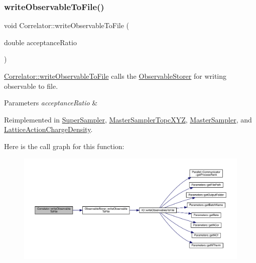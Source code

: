\subsubsection{\texorpdfstring{writeObservableToFile()}{writeObservableToFile()}}
{\footnotesize\ttfamily void Correlator\+::write\+Observable\+To\+File (\begin{DoxyParamCaption}\item[{double}]{acceptance\+Ratio }\end{DoxyParamCaption})\hspace{0.3cm}{\ttfamily [virtual]}}



\mbox{\hyperlink{class_correlator_a9e8d80e30e4fbe3b7fe57521538cb5ff}{Correlator\+::write\+Observable\+To\+File}} calls the \mbox{\hyperlink{class_observable_storer}{Observable\+Storer}} for writing observable to file. 


\begin{DoxyParams}{Parameters}
{\em acceptance\+Ratio} & \\
\hline
\end{DoxyParams}


Reimplemented in \mbox{\hyperlink{class_super_sampler_a05b42b82879233dc329d280a61bfd7f0}{Super\+Sampler}}, \mbox{\hyperlink{class_master_sampler_topc_x_y_z_a930f13a2a13f4b3820f40c8b52110cf2}{Master\+Sampler\+Topc\+X\+YZ}}, \mbox{\hyperlink{class_master_sampler_a638714c38e1a6252ab8b6be1fa224bd4}{Master\+Sampler}}, and \mbox{\hyperlink{class_lattice_action_charge_density_a719f71aaccbf1b4147ea944781d69908}{Lattice\+Action\+Charge\+Density}}.

Here is the call graph for this function\+:
\nopagebreak
\begin{figure}[H]
\begin{center}
\leavevmode
\includegraphics[width=350pt]{class_correlator_a9e8d80e30e4fbe3b7fe57521538cb5ff_cgraph}
\end{center}
\end{figure}


